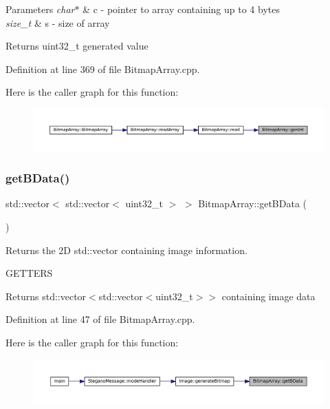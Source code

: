 \begin{DoxyParams}{Parameters}
{\em char$\ast$} & c -\/ pointer to array containing up to 4 bytes \\
\hline
{\em size\+\_\+t} & s -\/ size of array \\
\hline
\end{DoxyParams}
\begin{DoxyReturn}{Returns}
uint32\+\_\+t generated value 
\end{DoxyReturn}


Definition at line 369 of file Bitmap\+Array.\+cpp.

Here is the caller graph for this function\+:\nopagebreak
\begin{figure}[H]
\begin{center}
\leavevmode
\includegraphics[width=350pt]{classBitmapArray_a158fbbaa026332a732f644a8c368a2f0_icgraph}
\end{center}
\end{figure}
\mbox{\label{classBitmapArray_a66bd389c357de601df924569a0b38429}} 
\subsubsection{\texorpdfstring{getBData()}{getBData()}}
{\footnotesize\ttfamily std\+::vector$<$ std\+::vector$<$ uint32\+\_\+t $>$ $>$ Bitmap\+Array\+::get\+B\+Data (\begin{DoxyParamCaption}{ }\end{DoxyParamCaption})}



Returns the 2D std\+::vector containing image information. 

G\+E\+T\+T\+E\+RS\begin{DoxyReturn}{Returns}
std\+::vector$<$std\+::vector$<$uint32\+\_\+t$>$$>$ containing image data 
\end{DoxyReturn}


Definition at line 47 of file Bitmap\+Array.\+cpp.

Here is the caller graph for this function\+:
\nopagebreak
\begin{figure}[H]
\begin{center}
\leavevmode
\includegraphics[width=350pt]{classBitmapArray_a66bd389c357de601df924569a0b38429_icgraph}
\end{center}
\end{figure}
\mbox{\label{classBitmapArray_ab914d6282460b386b2b5f936190487a2}} 
